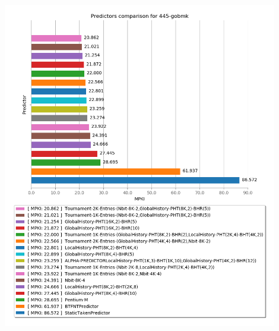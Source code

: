    \begin{minipage}{\textwidth}
      \begin{center}
         \\
         \vspace{3mm}
         \includegraphics[width=0.9\textwidth, frame]{./graphs/4-5/445-gobmk.png}
         \vspace{6mm}
      \end{center}
   \end{minipage}

